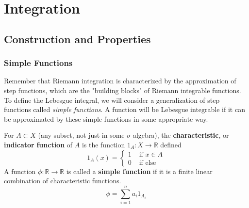 \section{Integration}

\subsection{Construction and Properties}

  \subsubsection{Simple Functions}

    Remember that Riemann integration is characterized by the approximation of step functions, which are the "building blocks" of Riemann integrable functions. To define the Lebesgue integral, we will consider a generalization of step functions called \textit{simple functions}. A function will be Lebesgue integrable if it can be approximated by these simple functions in some appropriate way. 

    \begin{definition}
      For $A \subset X$ (any subset, not just in some $\sigma$-algebra), the \textbf{characteristic}, or \textbf{indicator} \textbf{function} of $A$ is the function $1_A : X \longrightarrow \mathbb{R}$ defined 
      \begin{equation}
        1_A (x) = \begin{cases} 1 & \text{ if } x \in A \\ 0 & \text{ if else} \end{cases}
      \end{equation}
      A function $\phi: \mathbb{R} \longrightarrow \mathbb{R}$ is called a \textbf{simple function} if it is a finite linear combination of characteristic functions. 
      \begin{equation}
        \phi = \sum_{i=1}^n a_i 1_{A_i}
      \end{equation}
    \end{definition}

